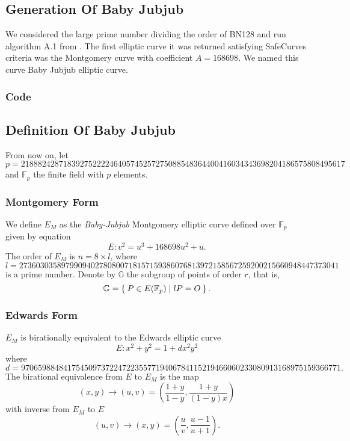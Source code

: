 \documentclass{article}
\newcommand{\Fp}{\ensuremath{\mathbb{F}_p}}
\newcommand{\G}{\ensuremath{\mathbb{G}}}
\begin{document}
\begin{spacing}{1.2}
	\subsection{Generation Of Baby Jubjub}
		We considered the large prime number dividing the order of BN128 and run algorithm A.1 from \cite{generation-baby}. The first elliptic curve it was returned  satisfying SafeCurves criteria was the Montgomery curve with coefficient $A = 168698$. We named this curve Baby Jubjub elliptic curve. 

		\subsubsection{Code}
		\vspace{0.5cm}

	\subsection{Definition Of Baby Jubjub}
		From now on, let 
			$$	p = 21888242871839275222246405745257275088548364
					400416034343698204186575808495617 $$
		and $\Fp$ the finite field with $p$ elements. 
		
		\subsubsection{Montgomery Form}
			We define $E_M$ as the {\it Baby-Jubjub} Montgomery elliptic curve defined over $\Fp$ given %
			by equation
			$$	E: v^2 = u^3 +  168698u^2 + u. $$
			The order of $E_M$ is $n = 8\times l$, where 
			$$	l = 2736030358979909402780800718157159386076813972
			158567259200215660948447373041 $$ 
			is a prime number. Denote by $\G$ the subgroup of points of order $r$, that is, %
			$$\G = \Set{ P \in E(\Fp) | l P = O  }.$$

		\subsubsection{Edwards Form}
			$E_M$ is birationally equivalent to the Edwards elliptic curve %
				$$	E: x^2 + y^2 = 1 +  d x^2 y^2 $$
			where
			$ d = 9706598848417545097372247223557719406784115219466060233080913168975159366771.$ \\
			
			The birational equivalence \cite[Thm. 3.2]{twisted} from $E$ to $E_M$ is the map
			$$ (x,y) \to (u,v) = \left( \frac{1 + y}{1 - y} , \frac{1 + y}{(1 - y)x} \right) $$
			with inverse from $E_M$ to $E$
			$$ (u, v) \to (x, y) = \left(  \frac{u}{v}, \frac{u - 1}{u + 1}   \right). $$


\end{spacing}
\end{document}
